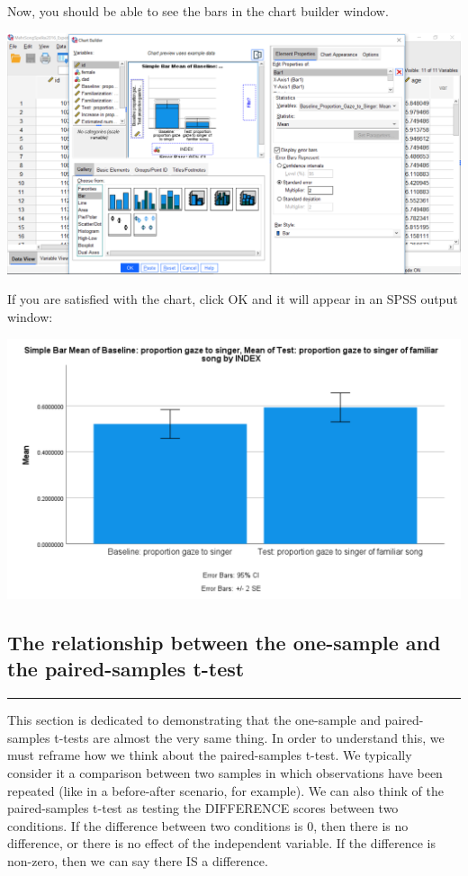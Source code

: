\documentclass[]{book}
\begin{document}
Now, you should be able to see the bars in the chart builder window.

\includegraphics{img/6.4.29.png}

If you are satisfied with the chart, click OK and it will appear in an
SPSS output window:

\includegraphics{img/6.4.30.png}

\subsection{The relationship between the one-sample and the
paired-samples
t-test}\label{the-relationship-between-the-one-sample-and-the-paired-samples-t-test}

\begin{center}\rule{0.5\linewidth}{0.5pt}\end{center}

This section is dedicated to demonstrating that the one-sample and
paired-samples t-tests are almost the very same thing. In order to
understand this, we must reframe how we think about the paired-samples
t-test. We typically consider it a comparison between two samples in
which observations have been repeated (like in a before-after scenario,
for example). We can also think of the paired-samples t-test as testing
the DIFFERENCE scores between two conditions. If the difference between
two conditions is 0, then there is no difference, or there is no effect
of the independent variable. If the difference is non-zero, then we can
say there IS a difference.
\end{document}
